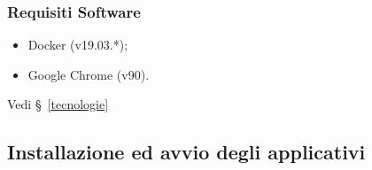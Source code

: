 \subsubsection{Requisiti Software}
    \begin{itemize}
        \item Docker (v19.03.*);
        \item Google Chrome (v90).
    \end{itemize}

    Vedi \S\ \ref{tecnologie}

    \begin{comment}
    	\item Client:
    \begin{itemize}
    	\item Docker.

    \end{itemize}
    	\item Server:
    \begin{itemize}
    	\item Docker.

    \end{itemize}
    \end{comment}







\subsection{Installazione ed avvio degli applicativi}
